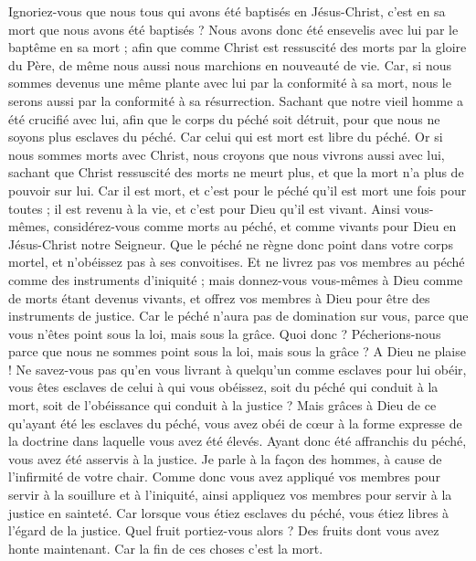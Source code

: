 \begin{multicols}{2}
Ignoriez-vous que nous tous qui avons été baptisés en Jésus-Christ, c’est en sa mort que nous avons été baptisés ?
Nous avons donc été ensevelis avec lui par le baptême en sa mort ; afin que comme Christ est ressuscité des morts par la gloire du Père, de même nous aussi nous marchions en nouveauté de vie.
Car, si nous sommes devenus une même plante avec lui par la conformité à sa mort, nous le serons aussi par la conformité à sa résurrection.
Sachant que notre vieil homme a été crucifié avec lui, afin que le corps du péché soit détruit, pour que nous ne soyons plus esclaves du péché.
Car celui qui est mort est libre du péché.
Or si nous sommes morts avec Christ, nous croyons que nous vivrons aussi avec lui,
sachant que Christ ressuscité des morts ne meurt plus, et que la mort n'a plus de pouvoir sur lui.
Car il est mort, et c’est pour le péché qu’il est mort une fois pour toutes ; il est revenu à la vie, et c’est pour Dieu qu’il est vivant.
Ainsi vous-mêmes, considérez-vous comme morts au péché, et comme vivants pour Dieu en Jésus-Christ notre Seigneur.
Que le péché ne règne donc point dans votre corps mortel, et n’obéissez pas à ses convoitises.
Et ne livrez pas vos membres au péché comme des instruments d'iniquité ; mais donnez-vous vous-mêmes à Dieu comme de morts étant devenus vivants, et offrez vos membres à Dieu pour être des instruments de justice.
Car le péché n'aura pas de domination sur vous, parce que vous n'êtes point sous la loi, mais sous la grâce.
Quoi donc ? Pécherions-nous parce que nous ne sommes point sous la loi, mais sous la grâce ? A Dieu ne plaise !
Ne savez-vous pas qu’en vous livrant à quelqu’un comme esclaves pour lui obéir, vous êtes esclaves de celui à qui vous obéissez, soit du péché qui conduit à la mort, soit de l'obéissance qui conduit à la justice ?
Mais grâces à Dieu de ce qu'ayant été les esclaves du péché, vous avez obéi de cœur à la forme expresse de la doctrine dans laquelle vous avez été élevés.
Ayant donc été affranchis du péché, vous avez été asservis à la justice.
Je parle à la façon des hommes, à cause de l'infirmité de votre chair. Comme donc vous avez appliqué vos membres pour servir à la souillure et à l’iniquité, ainsi appliquez vos membres pour servir à la justice en sainteté.
Car lorsque vous étiez esclaves du péché, vous étiez libres à l'égard de la justice.
Quel fruit portiez-vous alors ? Des fruits dont vous avez honte maintenant. Car la fin de ces choses c’est la mort.

\end{multicols}
